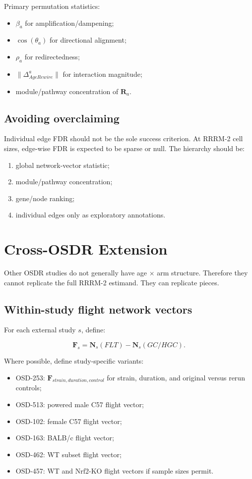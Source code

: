 \documentclass[11pt]{article}
\begin{document}
Primary permutation statistics:

\begin{itemize}
  \item $\beta_a$ for amplification/dampening;
  \item $\cos(\theta_a)$ for directional alignment;
  \item $\rho_a$ for redirectedness;
  \item $\|\Delta^{a}_{AgeRewire}\|$ for interaction magnitude;
  \item module/pathway concentration of $\mathbf{R}_a$.
\end{itemize}

\subsection{Avoiding overclaiming}

Individual edge FDR should not be the sole success criterion. At RRRM-2 cell
sizes, edge-wise FDR is expected to be sparse or null. The hierarchy should be:

\begin{enumerate}
  \item global network-vector statistic;
  \item module/pathway concentration;
  \item gene/node ranking;
  \item individual edges only as exploratory annotations.
\end{enumerate}

\section{Cross-OSDR Extension}

Other OSDR studies do not generally have age $\times$ arm structure. Therefore
they cannot replicate the full RRRM-2 estimand. They can replicate pieces.

\subsection{Within-study flight network vectors}

For each external study $s$, define:

\[
\mathbf{F}_s =
\mathbf{N}_s(FLT) - \mathbf{N}_s(GC/HGC).
\]

Where possible, define study-specific variants:

\begin{itemize}
  \item OSD-253: $\mathbf{F}_{strain,duration,control}$ for strain, duration,
        and original versus rerun controls;
  \item OSD-513: powered male C57 flight vector;
  \item OSD-102: female C57 flight vector;
  \item OSD-163: BALB/c flight vector;
  \item OSD-462: WT subset flight vector;
  \item OSD-457: WT and Nrf2-KO flight vectors if sample sizes permit.
\end{itemize}
\end{document}
